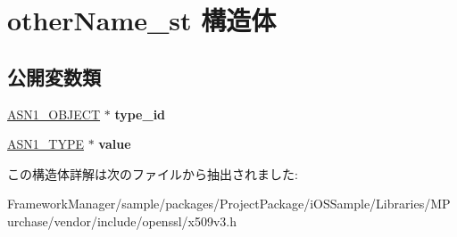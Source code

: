 \hypertarget{structother_name__st}{}\section{other\+Name\+\_\+st 構造体}
\label{structother_name__st}
\subsection*{公開変数類}
\begin{DoxyCompactItemize}
\item 
\hypertarget{structother_name__st_a6a75851c46b8796a1f986ef545d423a6}{}\hyperlink{structasn1__object__st}{A\+S\+N1\+\_\+\+O\+B\+J\+E\+C\+T} $\ast$ {\bfseries type\+\_\+id}\label{structother_name__st_a6a75851c46b8796a1f986ef545d423a6}

\item 
\hypertarget{structother_name__st_a490a0f0d33dd8e1b7a2283b6da0951d5}{}\hyperlink{structasn1__type__st}{A\+S\+N1\+\_\+\+T\+Y\+P\+E} $\ast$ {\bfseries value}\label{structother_name__st_a490a0f0d33dd8e1b7a2283b6da0951d5}

\end{DoxyCompactItemize}


この構造体詳解は次のファイルから抽出されました\+:\begin{DoxyCompactItemize}
\item 
Framework\+Manager/sample/packages/\+Project\+Package/i\+O\+S\+Sample/\+Libraries/\+M\+Purchase/vendor/include/openssl/x509v3.\+h\end{DoxyCompactItemize}
